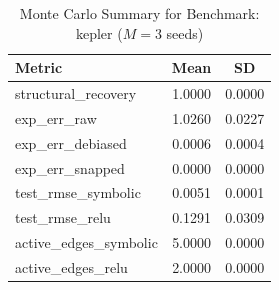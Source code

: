\begin{table}[ht]
\centering
\caption{Monte Carlo Summary for Benchmark: kepler ($M = 3$ seeds)}
\begin{tabular}{lcc}
\hline
Metric & Mean & SD \\
\hline
structural\_recovery & 1.0000 & 0.0000 \\
exp\_err\_raw & 1.0260 & 0.0227 \\
exp\_err\_debiased & 0.0006 & 0.0004 \\
exp\_err\_snapped & 0.0000 & 0.0000 \\
test\_rmse\_symbolic & 0.0051 & 0.0001 \\
test\_rmse\_relu & 0.1291 & 0.0309 \\
active\_edges\_symbolic & 5.0000 & 0.0000 \\
active\_edges\_relu & 2.0000 & 0.0000 \\
\hline
\end{tabular}
\end{table}
